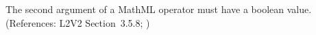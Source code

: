 The second argument of a MathML  operator must have
a boolean value.  (References: L2V2 Section~3.5.8; )

